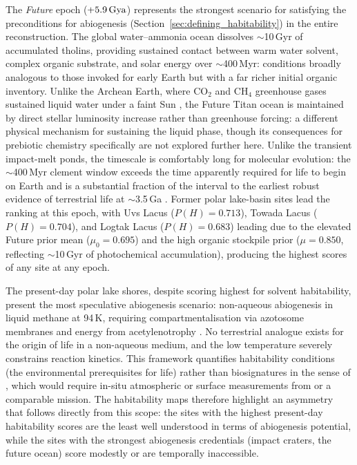 The \textit{Future} epoch ($+5.9\,\text{Gya}$) represents the strongest scenario for satisfying the preconditions for abiogenesis (Section~\ref{sec:defining_habitability}) in the entire reconstruction.  The global water--ammonia ocean dissolves $\sim$10\,Gyr of accumulated tholins, providing sustained contact between warm water solvent, complex organic substrate, and solar energy over $\sim$400\,Myr: conditions broadly analogous to those invoked for early Earth but with a far richer initial organic inventory.  Unlike the Archean Earth, where CO$_2$ and CH$_4$ greenhouse gases sustained liquid water under a faint Sun \citep{CatlingZahnle2020}, the Future Titan ocean is maintained by direct stellar luminosity increase rather than greenhouse forcing: a different physical mechanism for sustaining the liquid phase, though its consequences for prebiotic chemistry specifically are not explored further here.  Unlike the transient impact-melt ponds, the timescale is comfortably long for molecular evolution: the $\sim$400\,Myr clement window exceeds the time apparently required for life to begin on Earth \citep{Lorenz1997} and is a substantial fraction of the interval to the earliest robust evidence of terrestrial life at $\sim$3.5\,Ga \citep{Brasier2015}.  Former polar lake-basin sites lead the ranking at this epoch, with Uvs Lacus ($P(H){=}0.713$), Towada Lacus ($P(H){=}0.704$), and Logtak Lacus ($P(H){=}0.683$) leading due to the elevated Future prior mean ($\mu_0 = 0.695$) and the high organic stockpile prior ($\mu = 0.850$, reflecting $\sim$10\,Gyr of photochemical accumulation), producing the highest scores of any site at any epoch.

The present-day polar lake shores, despite scoring highest for solvent habitability, present the most speculative abiogenesis scenario: non-aqueous abiogenesis in liquid methane at 94\,K, requiring compartmentalisation via azotosome membranes \citep{Stevenson2015} and energy from acetylenotrophy \citep{McKaySmith2005}.  No terrestrial analogue exists for the origin of life in a non-aqueous medium, and the low temperature severely constrains reaction kinetics.  This framework quantifies habitability conditions (the environmental prerequisites for life) rather than biosignatures in the sense of \citet{SchwietermanLeung2024}, which would require in-situ atmospheric or surface measurements from \dragonfly{} or a comparable mission.  The habitability maps therefore highlight an asymmetry that follows directly from this scope: the sites with the highest present-day habitability scores are the least well understood in terms of abiogenesis potential, while the sites with the strongest abiogenesis credentials (impact craters, the future ocean) score modestly or are temporally inaccessible.

